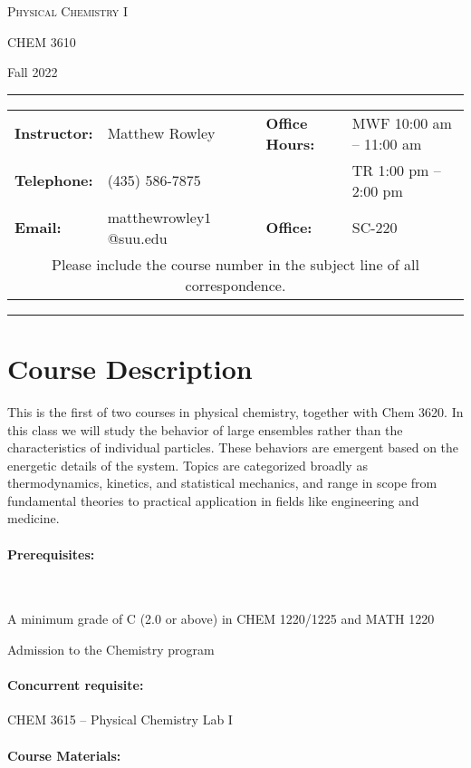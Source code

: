 \documentclass[12pt, letterpaper]{article}
\begin{document}
\begin{center}
	{\Large \textsc{Physical Chemistry I}}

	CHEM 3610
\end{center}
\begin{center}
	{\large Fall 2022}
\end{center}
\begin{center}
	\rule{0.99\textwidth}{0.4pt}
	\begin{tabular}{llcll}
		\textbf{Instructor:} & Matthew Rowley           &  & \textbf{Office Hours:} & MWF 10:00 am -- 11:00 am \\
		\textbf{Telephone:}  & (435) 586-7875           &  &                        & TR 1:00 pm -- 2:00 pm    \\
		\textbf{Email:}      & matthewrowley$1$@suu.edu &  & \textbf{Office:}       & SC-220                   \\
		\multicolumn{5}{c}{Please include the course number in the subject line of all correspondence.}
	\end{tabular}
	\rule{0.99\textwidth}{0.4pt}
\end{center}

\section*{Course Description}
This is the first of two courses in physical chemistry, together with Chem 3620. In this class we will study the behavior of large ensembles rather than the characteristics of individual particles. These behaviors are emergent based on the energetic details of the system. Topics are categorized broadly as thermodynamics, kinetics, and statistical mechanics, and range in scope from fundamental theories to practical application in fields like engineering and medicine.

\paragraph{Prerequisites:}~

A minimum grade of C (2.0 or above) in CHEM 1220/1225 and MATH 1220

Admission to the Chemistry program

\paragraph{Concurrent requisite:}
CHEM 3615 -- Physical Chemistry Lab I

\paragraph{Course Materials:} ~
\end{document}
